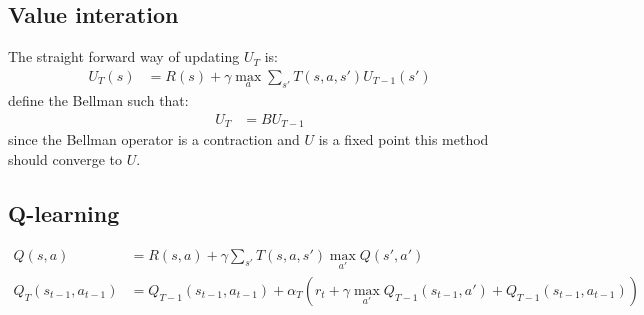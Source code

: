\documentclass{article}
\begin{document}
\subsection*{Value interation}
The straight forward way of updating $U_T$ is:
\begin{align*}
    U_T(s) &= R(s)+\gamma \max_{a} \sum_{s'} T(s,a,s')U_{T-1}(s')
\end{align*}
define the Bellman such that:
\begin{align*}
    U_T &= BU_{T-1}
\end{align*}
since the Bellman operator is a contraction and $U$ is a fixed point this method should converge 
to $U$. 
\subsection*{Q-learning}
\begin{align*}
    Q(s,a) 
    &= R(s,a)+\gamma \sum_{s'}T(s,a,s')\max_{a'}Q(s',a') \\
    Q_T(s_{t-1},a_{t-1}) &= Q_{T-1}(s_{t-1},a_{t-1}) + \alpha_T(r_t + \gamma \max_{a'}Q_{T-1}(s_{t-1},a')+Q_{T-1}(s_{t-1},a_{t-1}))
\end{align*}
\end{document}
